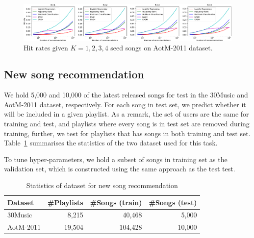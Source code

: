\begin{figure}[!h]
\centering
\includegraphics[width=\linewidth]{fig/aotm2011-2.pdf}
\caption{Hit rates given $K=1,2,3,4$ seed songs on AotM-2011 dataset.}
\end{figure}



\subsection{New song recommendation}
\label{ssec:newsongrec}

We hold 5,000 and 10,000 of the latest released songs for test in the 30Music and AotM-2011 dataset, respectively.
For each song in test set, we predict whether it will be included in a given playlist.
As a remark, the set of users are the same for training and test, 
and playlists where every song is in test set are removed during training,
further, we test for playlists that has songs in both training and test set.
Table~\ref{tab:stats_newsongrec} summarises the statistics of the two dataset used for this task.

To tune hyper-parameters, we hold a subset of songs in training set as the validation set, 
which is constructed using the same approach as the test test.

\begin{table}[!h]
\centering
\caption{Statistics of dataset for new song recommendation}
\label{tab:stats_newsongrec}
\small
\begin{tabular}{l|rrr}
\toprule
Dataset   & \#Playlists & \#Songs (train) & \#Songs (test) \\
\midrule
30Music   & 8,215       & 40,468          & 5,000 \\
AotM-2011 & 19,504      & 104,428         & 10,000 \\
\bottomrule
\end{tabular}
\end{table}

%

